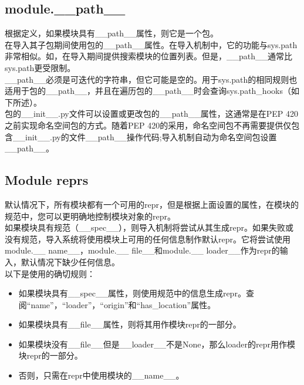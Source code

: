 \documentclass[10pt,UTF8]{ctexart}
\begin{document}
\subsection{module.__path__} 
根据定义，如果模块具有__path__属性，则它是一个包。\\
\indent 在导入其子包期间使用包的__path__属性。在导入机制中，它的功能与sys.path非常相似。如，在导入期间提供搜索模块的位置列表。但是，__path__通常比sys.path更受限制。\\
\indent __path__必须是可迭代的字符串，但它可能是空的。用于sys.path的相同规则也适用于包的__path__，并且在遍历包的__path__时会查询sys.path_hooks（如下所述）。\\
\indent 包的__init__.py文件可以设置或更改包的__path__属性，这通常是在PEP 420之前实现命名空间包的方式。随着PEP 420的采用，命名空间包不再需要提供仅包含__init__.py的文件__path__操作代码;导入机制自动为命名空间包设置__path__。
\subsection{Module reprs}
默认情况下，所有模块都有一个可用的repr，但是根据上面设置的属性，在模块的规范中，您可以更明确地控制模块对象的repr。\\
\indent 如果模块具有规范（__spec__），则导入机制将尝试从其生成repr。如果失败或没有规范，导入系统将使用模块上可用的任何信息制作默认repr。它将尝试使用module.__ name__，module.__ file__和module.__ loader__作为repr的输入，默认情况下缺少任何信息。\\
以下是使用的确切规则：\\
\begin{itemize}
\item 如果模块具有__spec__属性，则使用规范中的信息生成repr。查阅“name”，“loader”，“origin”和“has_location”属性。
\item 如果模块具有__file__属性，则将其用作模块repr的一部分。
\item 如果模块没有__file__但是__loader__不是None，那么loader的repr用作模块repr的一部分。
\item 否则，只需在repr中使用模块的__name__。
\end{itemize}
\end{document}
